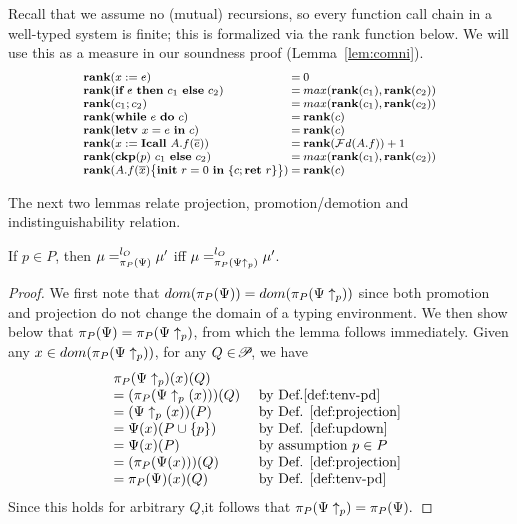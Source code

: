 {{{Recall that we assume no (mutual) recursions, so every function call
chain in a well-typed system is finite; this is formalized via the rank function below. We will use this
as a measure in our soundness proof (Lemma~\ref{lem:comni}).
\begin{equation*}
\myeqsize
\arraycolsep=1.0pt\def\arraystretch{1}
\begin{array}{lcl}
\rank{\lcASS{x}{e}} & = &0\\
\rank{\lcIF{e}{c_1}{c_2}} & = &max(\rank{c_1}, \rank{c_2)}\\
\rank{\lcSEQ{c_1}{c_2}} & = &max(\rank{c_1}, \rank{c_2})\\
\rank{\lcWHILE{e}{c}} & = &\rank{c} \\
\rank{\lcLETV{x}{e}{c}} & = &\rank{c} \\
\rank{\lcCALL{x}{A.f}{\overline{e}}} & = &
   \rank{\FD(A.f)} + 1\\
\rank{\lcCP{p}{c_1}{c_2}} & = & max(\rank{c_1}, \rank{c_2})\\
\rank{\lpFUN{A.f}{\overline x}{c}} &=& \rank{c}
\end{array}
\end{equation*}


The next two lemmas relate projection, promotion/demotion
and indistinguishability relation.

\begin{lemma}\label{lem:up}
If $p \in P$, then $\mu =_{\app{\Psi}{P}}^{l_{O}} \mu'$ iff $\mu =_{\app{\Psi\uparrow_{p}}{P}}^{l_{O}} \mu'$.
\end{lemma}
\begin{proof}
  We first note that $dom(\app{\Psi}{P}) = dom(\app{\Psi\uparrow_{p}}{P})$ since both
  promotion and projection do not change the domain of a typing environment.
  We then show below that $\app{\Psi}{P} = \app{\Psi\uparrow_p}{P}$, from which the
  lemma follows immediately.
  Given any $x \in dom(\app{\Psi\uparrow_{p}}{P})$,
  for any $Q \in \PPS$, we have
  {\myeqsize$$
  \begin{array}{ll}
    \app{\Psi\uparrow_p}{P}(x)(Q) & \\
    = (\app{\Psi\uparrow_p(x)}{P})(Q) & \mbox{ by Def.\ref{def:tenv-pd} }\\
    = (\Psi\uparrow_p(x))(P) & \mbox{ by Def. \ref{def:projection} }\\
    = \Psi(x)(P \cup \{p\}) & \mbox { by Def. \ref{def:updown} } \\
    = \Psi(x)(P) & \mbox{ by assumption $p \in P$ }\\
    = (\app{\Psi(x)}{P})(Q) & \mbox{ by Def. \ref{def:projection} }\\
    = \app{\Psi}{P}(x)(Q) & \mbox{ by Def. \ref{def:tenv-pd} }
  \end{array}
  $$}
  Since this holds for arbitrary $Q$,it follows that $\app{\Psi\uparrow_p}{P} = \app{\Psi}{P}.$
\end{proof}

}}}
